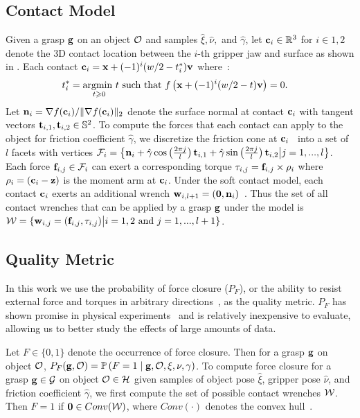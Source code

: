 \subsection{Contact Model}
Given a grasp $\mathbf{g}$ on an object $\mathcal{O}$ and samples $\hat{\xi}, \hat{\nu},$ and $\hat{\gamma}$, let $\mathbf{c}_i \in \mathbb{R}^3$ for $i \in {1, 2}$ denote the 3D contact location between the $i$-th gripper jaw and surface as shown in .
Each contact $\mathbf{c}_i = \mathbf{x} + (-1)^{i} (w / 2 - t_i^*) \mathbf{v}$ where~\cite{mahler2015gp}:
\begin{align*}
	t_i^* &= \underset{t \geqslant 0}{\text{argmin }} t \text{ such that } f\left(\mathbf{x} +  (-1)^{i} (w / 2 - t) \mathbf{v}\right) = 0.
\end{align*}
\noindent Let $\mathbf{n}_i = \nabla f(\mathbf{c}_i) / \| \nabla f(\mathbf{c}_i) \|_2$ denote the surface normal at contact $\mathbf{c}_i$ with tangent vectors $\mathbf{t}_{i,1}, \mathbf{t}_{i,2} \in \mathbb{S}^2$.
To compute the forces that each contact can apply to the object for friction coefficient $\hat{\gamma}$, we discretize the friction cone at $\mathbf{c}_i$~\cite{pokorny2013c} into a set of $l$ facets with vertices $\mathcal{F}_{i} = \left\{ \mathbf{n}_i + \hat{\gamma} \cos \left( \frac{2 \pi j}{l} \right) \mathbf{t}_{i,1} + \hat{\gamma} \sin \left( \frac{2 \pi j}{l} \right) \mathbf{t}_{i,2} \big| j = 1, ..., l \right\}$.
Each force $\mathbf{f}_{i,j} \in \mathcal{F}_{i}$ can exert a corresponding torque $\tau_{i,j} = \mathbf{f}_{i,j} \times \rho_i$ where $\rho_i = (\mathbf{c}_i - \mathbf{z})$ is the moment arm at $\mathbf{c}_i$.
Under the soft contact model, each contact $\mathbf{c}_i$ exerts an additional wrench $\mathbf{w}_{i,l+1} = (\mathbf{0}, \mathbf{n}_i)$~\cite{zheng2005}.
Thus the set of all contact wrenches that can be applied by a grasp $\mathbf{g}$ under the model is $\mathcal{W} = \{ \mathbf{w}_{i,j} = (\mathbf{f}_{i,j}, \tau_{i,j}) \big| i = 1, 2 \text{ and } j = 1, ..., l+1\}$.

\subsection{Quality Metric}
In this work we use the probability of force closure ($P_F$), or the ability to resist external force and torques in arbitrary directions~\cite{mahler2015gp}, as the quality metric.
$P_F$ has shown promise in physical experiments~\cite{kim2012physically, weisz2012pose} and is relatively inexpensive to evaluate, allowing us to better study the effects of large amounts of data.

Let $F \in \{0, 1\}$ denote the occurrence of force closure.
Then for a grasp $\mathbf{g}$ on object $\mathcal{O}$, $P_F(\mathbf{g}, \mathcal{O}) = \mathbb{P}\left(F = 1 \mid \mathbf{g}, \mathcal{O}, \xi, \nu, \gamma \right)$.
To compute force closure for a grasp $\mathbf{g} \in \mathcal{G}$ on object $\mathcal{O} \in \mathcal{H}$ given samples of object pose $\hat{\xi}$, gripper pose $\hat{\nu}$, and friction coefficient $\hat{\gamma}$, we first compute the set of possible contact wrenches $\mathcal{W}$.
Then $F = 1$ if $\mathbf{0} \in Conv(\mathcal{W})$, where $Conv(\cdot)$ denotes the convex hull~\cite{weisz2012pose}.

